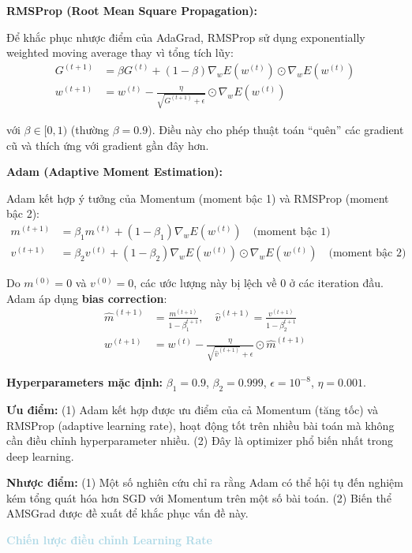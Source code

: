 \textbf{RMSProp (Root Mean Square Propagation):}

Để khắc phục nhược điểm của AdaGrad, RMSProp sử dụng exponentially weighted moving average thay vì tổng tích lũy:
\begin{align*}
G^{(t+1)} &= \beta G^{(t)} + (1-\beta) \nabla_w E(w^{(t)}) \odot \nabla_w E(w^{(t)}) \\
w^{(t+1)} &= w^{(t)} - \frac{\eta}{\sqrt{G^{(t+1)} + \epsilon}} \odot \nabla_w E(w^{(t)})
\end{align*}

với $\beta \in [0, 1)$ (thường $\beta = 0.9$). Điều này cho phép thuật toán ``quên'' các gradient cũ và thích ứng với gradient gần đây hơn.

\textbf{Adam (Adaptive Moment Estimation):}

Adam kết hợp ý tưởng của Momentum (moment bậc 1) và RMSProp (moment bậc 2):
\begin{align*}
m^{(t+1)} &= \beta_1 m^{(t)} + (1-\beta_1) \nabla_w E(w^{(t)}) \quad \text{(moment bậc 1)} \\
v^{(t+1)} &= \beta_2 v^{(t)} + (1-\beta_2) \nabla_w E(w^{(t)}) \odot \nabla_w E(w^{(t)}) \quad \text{(moment bậc 2)}
\end{align*}

Do $m^{(0)} = 0$ và $v^{(0)} = 0$, các ước lượng này bị lệch về 0 ở các iteration đầu. Adam áp dụng \textbf{bias correction}:
\begin{align*}
\hat{m}^{(t+1)} &= \frac{m^{(t+1)}}{1 - \beta_1^{t+1}}, \quad \hat{v}^{(t+1)} = \frac{v^{(t+1)}}{1 - \beta_2^{t+1}} \\
w^{(t+1)} &= w^{(t)} - \frac{\eta}{\sqrt{\hat{v}^{(t+1)}} + \epsilon} \odot \hat{m}^{(t+1)}
\end{align*}

\textbf{Hyperparameters mặc định:} $\beta_1 = 0.9$, $\beta_2 = 0.999$, $\epsilon = 10^{-8}$, $\eta = 0.001$.

\textbf{Ưu điểm:} (1) Adam kết hợp được ưu điểm của cả Momentum (tăng tốc) và RMSProp (adaptive learning rate), hoạt động tốt trên nhiều bài toán mà không cần điều chỉnh hyperparameter nhiều. (2) Đây là optimizer phổ biến nhất trong deep learning.

\textbf{Nhược điểm:} (1) Một số nghiên cứu chỉ ra rằng Adam có thể hội tụ đến nghiệm kém tổng quát hóa hơn SGD với Momentum trên một số bài toán. (2) Biến thể AMSGrad được đề xuất để khắc phục vấn đề này.

\vspace{0.5em}
\noindent\textcolor{lightblue}{\textbf{Chiến lược điều chỉnh Learning Rate}}
\vspace{0.5em}

